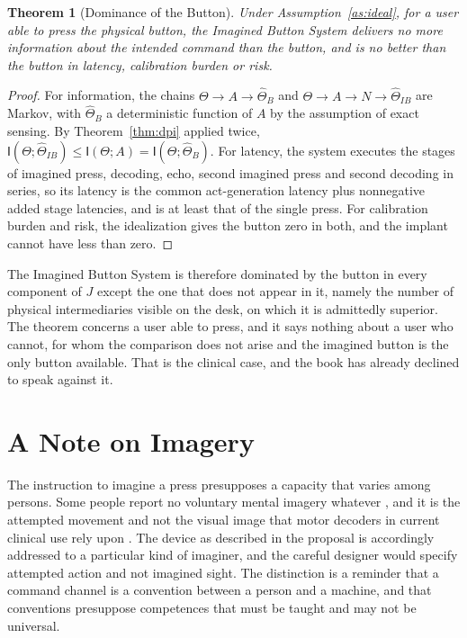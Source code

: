 \documentclass[11pt,twoside,openany]{book}
\newtheorem{theorem}{Theorem}[chapter]
\theoremstyle{definition}
\theoremstyle{remark}
\newcommand{\MI}{\mathsf{I}}
\newcommand{\Th}{\Theta}
\newcommand{\Thh}{\widehat{\Theta}}
\begin{document}
\begin{theorem}[Dominance of the Button]\label{thm:dominance}
Under Assumption~\ref{as:ideal}, for a user able to press the physical button, the Imagined Button System delivers no more information about the intended command than the button, and is no better than the button in latency, calibration burden or risk.
\end{theorem}
\begin{proof}
For information, the chains $\Th\to A\to\Thh_B$ and $\Th\to A\to N\to\Thh_{IB}$ are Markov, with $\Thh_B$ a deterministic function of $A$ by the assumption of exact sensing. By Theorem~\ref{thm:dpi} applied twice, $\MI(\Th;\Thh_{IB})\le\MI(\Th;A)=\MI(\Th;\Thh_B)$. For latency, the system executes the stages of imagined press, decoding, echo, second imagined press and second decoding in series, so its latency is the common act-generation latency plus nonnegative added stage latencies, and is at least that of the single press. For calibration burden and risk, the idealization gives the button zero in both, and the implant cannot have less than zero.
\end{proof}

The Imagined Button System is therefore dominated by the button in every component of $J$ except the one that does not appear in it, namely the number of physical intermediaries visible on the desk, on which it is admittedly superior. The theorem concerns a user able to press, and it says nothing about a user who cannot, for whom the comparison does not arise and the imagined button is the only button available. That is the clinical case, and the book has already declined to speak against it.

\section{A Note on Imagery}

The instruction to imagine a press presupposes a capacity that varies among persons. Some people report no voluntary mental imagery whatever \cite{zeman2015}, and it is the attempted movement and not the visual image that motor decoders in current clinical use rely upon \cite{wolpaw2002}. The device as described in the proposal is accordingly addressed to a particular kind of imaginer, and the careful designer would specify attempted action and not imagined sight. The distinction is a reminder that a command channel is a convention between a person and a machine, and that conventions presuppose competences that must be taught and may not be universal.
\end{document}
